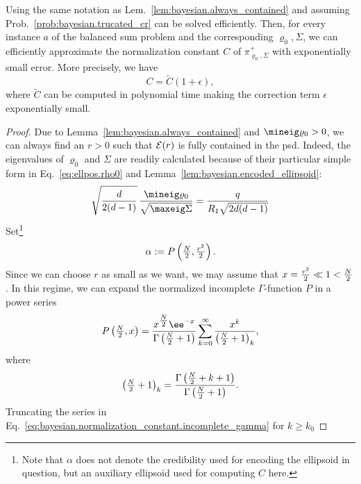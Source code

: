 \begin{lemma}\label{lem:bayesian.normalization_constant}
  Using the same notation as Lem.~\ref{lem:bayesian.always_contained} and assuming Prob.~\ref{prob:bayesian.trucated_cr} can be solved efficiently.
  Then, for every instance $a$ of the balanced sum problem and the corresponding $\varrho_0, \Sigma$, we can efficiently approximate the normalization constant $C$ of $\pi^+_{\varrho_0,\Sigma}$ with exponentially small error.
  More precisely, we have
  \begin{equation}
    C = \tilde C (1 + \epsilon),
  \end{equation}
  where $\tilde C$ can be computed in polynomial time making the correction term $\epsilon$ exponentially small.
\end{lemma}
\begin{proof}
  Due to Lemma~\ref{lem:bayesian.always_contained} and $\mineig\varrho_0 > 0$, we can always find an $r > 0$ such that $\mathcal{E}(r)$ is fully contained in the psd.
  Indeed, the eigenvalues of $\varrho_0$ and $\Sigma$ are readily calculated because of their particular simple form in Eq.~\eqref{eq:ellpos.rho0} and Lemma~\ref{lem:bayesian.encoded_ellipsoid}:
  \begin{equation}
    \sqrt{\frac{d}{2(d-1)}} \, \frac{\mineig\varrho_0}{\sqrt{\maxeig\Sigma}}
    =  \frac{q}{R_1 \sqrt{2d(d-1)}}
  \end{equation}
  Set\footnote{%
    Note that $\alpha$ does not denote the credibility used for encoding the ellipsoid in question, but an auxiliary ellipsoid used for computing $C$ here.
  }
  \begin{equation}
    \alpha := P\left( \tfrac{N}{2}, \tfrac{r^2}{2} \right).
  \end{equation}
  Since we can choose $r$ as small as we want, we may assume that $x = \frac{r^2}{2} \ll 1 < \tfrac{N}{2}$.
  In this regime, we can expand the normalized incomplete $\Gamma$-function $P$ in a power series~\cite{Gil_2012_Efficient}
  \begin{equation}
    \label{eq:bayesian.normalization_constant.incomplete_gamma}
    P\left( \Nhalf, x \right) = \frac{x^{\Nhalf} \ee^{-x}}{\Gamma\left( \Nhalf + 1 \right)} \sum_{k=0}^\infty \frac{x^k}{{\left( \Nhalf + 1 \right)}_k},
  \end{equation}
  where
  \begin{equation}
    {\left( \tfrac{N}{2}+ 1 \right)}_k = \frac{\Gamma\left( \tfrac{N}{2} + k + 1 \right)}{\Gamma\left( \tfrac{N}{2} + 1 \right)}.
  \end{equation}
  Truncating the series in Eq.~\eqref{eq:bayesian.normalization_constant.incomplete_gamma} for $k \ge k_0$

\end{proof}
